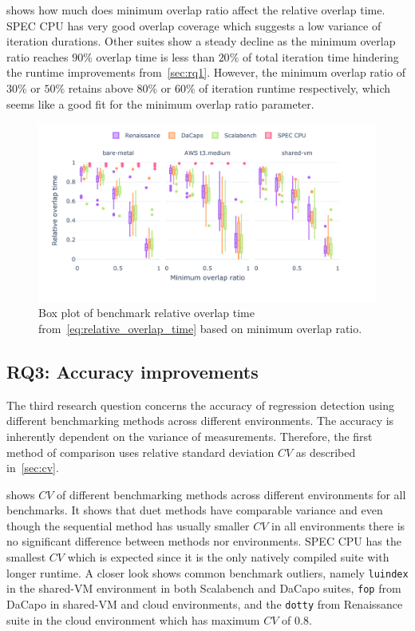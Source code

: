  shows how much does minimum overlap ratio affect the relative overlap time.
SPEC CPU has very good overlap coverage which suggests a low variance of iteration durations.
Other suites show a steady decline as the minimum overlap ratio reaches $90\%$ overlap time is less than $20\%$ of total iteration time hindering the runtime improvements from~\cref{sec:rq1}.
However, the minimum overlap ratio of $30\%$ or $50\%$ retains above $80\%$ or $60\%$ of iteration runtime respectively, which seems like a good fit for the minimum overlap ratio parameter.

\begin{figure}
	\centering
	\includegraphics[width=1\linewidth]{./figures/relative_overlap_time.pdf}
	\caption{
		Box plot of benchmark relative overlap time from~\cref{eq:relative_overlap_time} based on minimum overlap ratio.
	}
	\label{fig:relative_overlap_time}
\end{figure}

\subsection{RQ3: Accuracy improvements}
\label{sec:rq3}

The third research question concerns the accuracy of regression detection using different benchmarking methods across different environments.
The accuracy is inherently dependent on the variance of measurements.
Therefore, the first method of comparison uses relative standard deviation $CV$ as described in~\cref{sec:cv}.

 shows $CV$ of different benchmarking methods across different environments for all benchmarks.
It shows that duet methods have comparable variance and even though the sequential method has usually smaller $CV$ in all environments there is no significant difference between methods nor environments.
SPEC CPU has the smallest $CV$ which is expected since it is the only natively compiled suite with longer runtime.
A closer look shows common benchmark outliers, namely \lstinline{luindex} in the \mbox{shared-VM} environment in both Scalabench and DaCapo suites, \lstinline{fop} from DaCapo in \mbox{shared-VM} and cloud environments, and the \lstinline{dotty} from Renaissance suite in the cloud environment which has maximum $CV$ of $0.8$.

